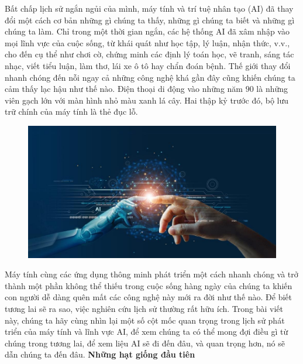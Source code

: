 \begin{multicols}{2}
	Bất chấp lịch sử ngắn ngủi của mình, máy tính và trí tuệ nhân tạo (AI) đã thay đổi một cách cơ bản những gì chúng ta thấy, những gì chúng ta biết và những gì chúng ta làm. Chỉ trong một thời gian ngắn, các hệ thống AI đã xâm nhập vào mọi lĩnh vực của cuộc sống, từ khái quát như học tập, lý luận, nhận thức, v.v., cho đến cụ thể như chơi cờ, chứng minh các định lý toán học, vẽ tranh, sáng tác nhạc, viết tiểu luận, làm thơ, lái xe ô tô hay chẩn đoán bệnh. Thế giới thay đổi nhanh chóng đến nỗi ngay cả những công nghệ khá gần đây cũng khiến chúng ta cảm thấy lạc hậu như thế nào. Điện thoại di động vào những năm $90$ là những viên gạch lớn với màn hình nhỏ màu xanh lá cây. Hai thập kỷ trước đó, bộ lưu trữ chính của máy tính là thẻ đục lỗ.
	\begin{figure}[H]
		\vspace*{-5pt}
		\centering
		\captionsetup{labelformat= empty, justification=centering}
		\includegraphics[width= 1\linewidth]{AI1.jpg}
		\vspace*{-15pt}
	\end{figure}
	Máy tính cùng các ứng dụng thông minh phát triển một cách nhanh chóng và trở thành một phần không thể thiếu trong cuộc sống hàng ngày của chúng ta khiến con người dễ dàng quên mất các công nghệ này mới ra đời như thế nào. Để biết tương lai sẽ ra sao, việc nghiên cứu lịch sử thường rất hữu ích. Trong bài viết này, chúng ta hãy cùng nhìn lại một số cột mốc quan trọng trong lịch sử phát triển của máy tính và lĩnh vực AI, để xem chúng ta có thể mong đợi điều gì từ chúng trong tương lai, để xem liệu AI sẽ đi đến đâu, và quan trọng hơn, nó sẽ dẫn chúng ta đến đâu.
	\vskip 0.1cm
	\textbf{\color{timhieukhoahoc}Những hạt giống đầu tiên}
	\vskip 0.1cm

\end{multicols}
